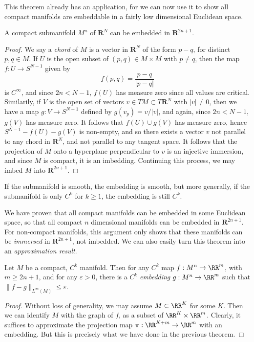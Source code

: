 This theorem already has an application, for we can now use it to show all compact manifolds are embeddable in a fairly low dimensional Euclidean space.

\begin{theorem}
    A compact submanifold $M^n$ of $\mathbf{R}^N$ can be embedded in $\mathbf{R}^{2n+1}$.
\end{theorem}
\begin{proof}
    We say a {\it chord} of $M$ is a vector in $\mathbf{R}^N$ of the form $p - q$, for distinct $p,q \in M$. If $U$ is the open subset of $(p,q) \in M \times M$ with $p \neq q$, then the map $f: U \to S^{N-1}$ given by
    \[ f(p,q) = \frac{p-q}{|p-q|} \]
    is $C^\infty$, and since $2n < N-1$, $f(U)$ has measure zero since all values are critical. Similarily, if $V$ is the open set of vectors $v \in TM \subset T\mathbf{R}^N$ with $|v| \neq 0$, then we have a map $g: V \to S^{N-1}$ defined by $g(v_p) = v/|v|$, and again, since $2n < N-1$, $g(V)$ has measure zero. It follows that $f(U) \cup g(V)$ has measure zero, hence $S^{N-1} - f(U) - g(V)$ is non-empty, and so there exists a vector $v$ not parallel to any chord in $\mathbf{R}^N$, and not parallel to any tangent space. It follows that the projection of $M$ onto a hyperplane perpendicular to $v$ is an injective immersion, and since $M$ is compact, it is an imbedding. Continuing this process, we may imbed $M$ into $\mathbf{R}^{2n+1}$.
\end{proof}

\begin{remark}
    If the submanifold is smooth, the embedding is smooth, but more generally, if the submanifold is only $C^k$ for $k \geq 1$, the embedding is still $C^k$.
\end{remark}

We have proven that all compact manifolds can be embedded in some Euclidean space, so that all compact $n$ dimensional manifolds can be embedded in $\mathbf{R}^{2n+1}$. For non-compact manifolds, this argument only shows that these manifolds can be {\it immersed} in $\mathbf{R}^{2n+1}$, not imbedded. We can also easily turn this theorem into an \emph{approximation result}.

\begin{theorem}
    Let $M$ be a compact, $C^k$ manifold. Then for any $C^k$ map $f: M^n \to \RR^m$, with $m \geq 2n + 1$, and for any $\varepsilon > 0$, there is a $C^k$ \emph{embedding} $g: M^n \to \RR^m$ such that $\| f - g \|_{L^\infty(M)} \leq \varepsilon$.
\end{theorem}
\begin{proof}
    Without loss of generality, we may assume $M \subset \RR^K$ for some $K$. Then we can identify $M$ with the graph of $f$, as a subset of $\RR^K \times \RR^m$. Clearly, it suffices to approximate the projection map $\pi: \RR^{K + m} \to \RR^m$ with an embedding. But this is precisely what we have done in the previous theorem.
\end{proof}

